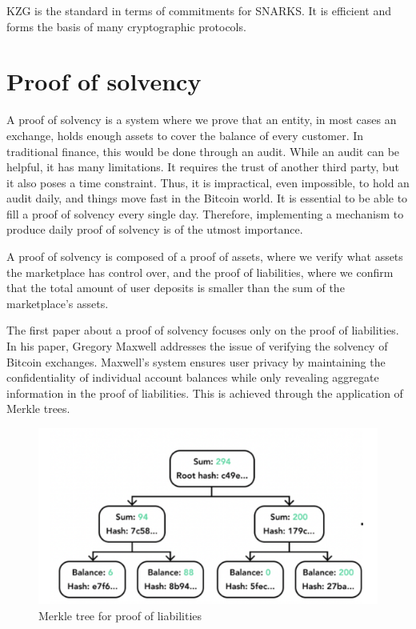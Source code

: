 KZG is the standard in terms of commitments for SNARKS. It is efficient and forms the basis of many cryptographic protocols. \cite{vODC24}


\section{Proof of solvency}

A proof of solvency is a system where we prove that an entity, in most cases an exchange, holds enough assets to cover
the balance of every customer. In traditional finance, this would be done through an audit. While an audit can be helpful,
it has many limitations. It requires the trust of another third party, but it also poses a time constraint. Thus, it is impractical, even impossible, to hold an audit daily, and things move fast in the Bitcoin world. It is essential to be able to fill a proof of solvency every single day.
Therefore, implementing a mechanism to produce daily proof of solvency is of the utmost importance.

A proof of solvency is composed of a proof of assets, where we verify what assets the marketplace has control over, and the proof of liabilities, 
where we confirm that the total amount of user deposits is smaller than the sum of the marketplace's assets.

The first paper about a proof of solvency focuses only on the proof of liabilities. In his paper, Gregory Maxwell addresses the issue of verifying
the solvency of Bitcoin exchanges. \cite{chainlink_blog}
Maxwell's system ensures user privacy by maintaining the confidentiality of individual account balances while only revealing aggregate information in the proof of liabilities.
This is achieved through the application of Merkle trees.


\begin{figure}[H]
\centering
\includegraphics[width=130mm]{MerkleTreeLiabilities.png}
\caption{Merkle tree for proof of liabilities}
\label{overflow}
\end{figure}


